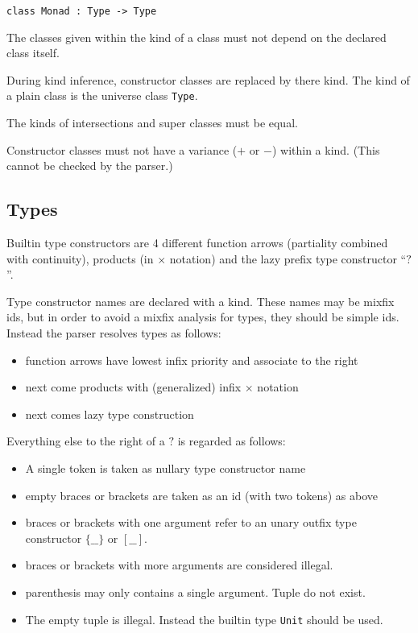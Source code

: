 \documentclass{article}
\begin{document}
\begin{verbatim}
class Monad : Type -> Type
\end{verbatim}

The classes given within the kind of a class must not depend on the declared
class itself.

During kind inference, constructor classes are replaced by there kind. The kind
of a plain class is the universe class \texttt{Type}.

The kinds of intersections and super classes must be equal.

Constructor classes must not have a variance ($+$ or $-$) within a kind. (This
cannot be checked by the parser.)

\subsection{Types}

Builtin type constructors are 4 different function arrows (partiality combined
with continuity), products (in $\times$ notation) and the lazy
prefix type constructor ``$?$''.

Type constructor names are declared with a kind. These names may be mixfix
ids, but in order to avoid a mixfix analysis for types, they should be
simple ids. Instead the parser resolves types as follows:

\begin{itemize}
\item function arrows have lowest infix priority and associate to the right
\item next come products with (generalized) infix $\times$ notation
\item next comes lazy type construction
\end{itemize}

Everything else to the right of a $?$ is regarded as follows:

\begin{itemize}
\item A single token is taken as nullary type constructor name
\item empty braces or brackets are taken as an id (with two tokens) as above
\item braces or brackets with one argument refer to an unary outfix type
  constructor $\{\_\_\}$ or $[\_\_]$.
\item braces or brackets with more arguments are considered illegal.
\item parenthesis may only contains a single argument. Tuple do not exist.
\item The empty tuple is illegal. Instead the builtin type 
  \texttt{Unit} should be used.
\end{itemize}
\end{document}
